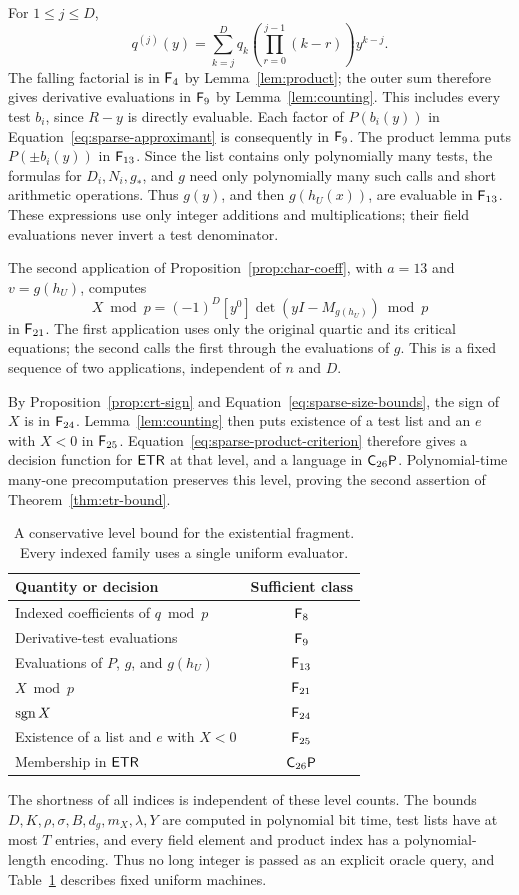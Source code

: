 For $1\le j\le D$,
\[
 q^{(j)}(y)=\sum_{k=j}^{D}q_k
       \left(\prod_{r=0}^{j-1}(k-r)\right)y^{k-j}.
\]
The falling factorial is in $\mathsf F_{4}$ by Lemma~\ref{lem:product};
the outer sum therefore gives derivative evaluations in
$\mathsf F_{9}$ by Lemma~\ref{lem:counting}.  This includes every
test $b_i$, since $R-y$ is directly evaluable.
Each factor of $P(b_i(y))$ in
Equation~\eqref{eq:sparse-approximant} is consequently in
$\mathsf F_{9}$.  The product lemma puts $P(\pm b_i(y))$ in
$\mathsf F_{13}$.  Since the list contains only polynomially many
tests, the formulas for $D_i,N_i,g_*$, and $g$ need only
polynomially many such calls and short arithmetic operations.
Thus $g(y)$, and then $g(h_U(x))$, are evaluable in
$\mathsf F_{13}$.  These expressions use only integer additions and
multiplications; their field evaluations never invert a test denominator.

The second application of Proposition~\ref{prop:char-coeff}, with
$a=13$ and $v=g(h_U)$, computes
\[
 X\bmod p=(-1)^D[y^0]\det(yI-M_{g(h_U)})\bmod p
\]
in $\mathsf F_{21}$.  The first application uses only the original
quartic and its critical equations; the second calls the first
through the evaluations of $g$.  This is a fixed sequence of two
applications, independent of $n$ and $D$.

By Proposition~\ref{prop:crt-sign} and
Equation~\eqref{eq:sparse-size-bounds}, the sign of $X$ is in
$\mathsf F_{24}$.  Lemma~\ref{lem:counting} then puts existence of
a test list and an $e$ with $X<0$ in $\mathsf F_{25}$.
Equation~\eqref{eq:sparse-product-criterion} therefore gives a
decision function for $\mathsf{ETR}$ at that level, and a language in
$\mathsf C_{26}\mathsf P$.  Polynomial-time many-one precomputation preserves
this level, proving the second assertion of Theorem~\ref{thm:etr-bound}.

\begin{table}[tb]
\centering
\begin{tabular}{lc}
\toprule
Quantity or decision & Sufficient class\\
\midrule
Indexed coefficients of $q\bmod p$ & $\mathsf F_{8}$\\
Derivative-test evaluations & $\mathsf F_{9}$\\
Evaluations of $P$, $g$, and $g(h_U)$ & $\mathsf F_{13}$\\
$X\bmod p$ & $\mathsf F_{21}$\\
$\operatorname{sgn} X$ & $\mathsf F_{24}$\\
Existence of a list and $e$ with $X<0$ & $\mathsf F_{25}$\\
Membership in $\mathsf{ETR}$ & $\mathsf C_{26}\mathsf P$\\
\bottomrule
\end{tabular}
\caption{A conservative level bound for the existential fragment.
Every indexed family uses a single uniform evaluator.}
\label{tab:existential-levels}
\end{table}

The shortness of all indices is independent of these level counts.
The bounds $D,K,\rho,\sigma,B,d_g,m_X,\lambda,Y$ are computed
in polynomial bit time, test lists have at most $T$ entries, and
every field element and product index has a polynomial-length
encoding.  Thus no long integer is passed as an explicit oracle
query, and Table~\ref{tab:existential-levels} describes fixed uniform
machines.
